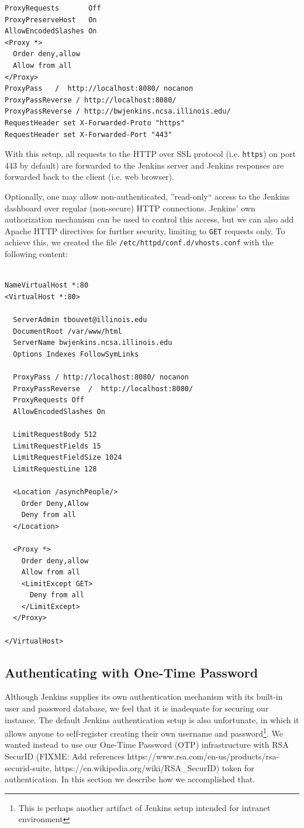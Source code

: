 \documentclass[10pt, conference, compsocconf]{IEEEtran}
\begin{document}
\begin{lstlisting}
ProxyRequests       Off
ProxyPreserveHost   On 
AllowEncodedSlashes On 
<Proxy *>
  Order deny,allow
  Allow from all  
</Proxy>
ProxyPass   /  http://localhost:8080/ nocanon
ProxyPassReverse / http://localhost:8080/
ProxyPassReverse / http://bwjenkins.ncsa.illinois.edu/
RequestHeader set X-Forwarded-Proto "https"
RequestHeader set X-Forwarded-Port "443"    
\end{lstlisting}

With this setup, all requests to the HTTP over SSL protocol (i.e. \texttt{https}) on port 443 by default) are forwarded to the Jenkins server and Jenkins responses are forwarded back to the client (i.e. web browser).

Optionally, one may allow non-authenticated, ''read-only`` access to the Jenkins dashboard over regular (non-secure) HTTP connections. 
Jenkins' own authorization mechanism can be used to control this access, but we can also add Apache HTTP directives for further security, limiting to \texttt{GET} requests only. 
To achieve this, we created the file \texttt{/etc/httpd/conf.d/vhosts.conf} with the following content:
\begin{lstlisting}
 
NameVirtualHost *:80
<VirtualHost *:80>

  ServerAdmin tbouvet@illinois.edu
  DocumentRoot /var/www/html
  ServerName bwjenkins.ncsa.illinois.edu
  Options Indexes FollowSymLinks

  ProxyPass / http://localhost:8080/ nocanon
  ProxyPassReverse  /  http://localhost:8080/
  ProxyRequests Off
  AllowEncodedSlashes On

  LimitRequestBody 512
  LimitRequestFields 15
  LimitRequestFieldSize 1024
  LimitRequestLine 128

  <Location /asynchPeople/>
    Order Deny,Allow
    Deny from all
  </Location>

  <Proxy *>
    Order deny,allow
    Allow from all
    <LimitExcept GET>
      Deny from all
    </LimitExcept>
  </Proxy>

</VirtualHost>

\end{lstlisting}

\subsection{Authenticating with One-Time Password}

Although Jenkins supplies its own authentication mechanism with its built-in user and password database, we feel that it is inadequate for securing our instance. 
The default Jenkins authentication setup is also unfortunate, in which it allows anyone to self-register creating their own username and password\footnote{This is perhaps another artifact of Jenkins setup intended for intranet environment}. 
We wanted instead to use our One-Time Password (OTP) infrastructure with RSA SecurID (FIXME: Add references https://www.rsa.com/en-us/products/rsa-securid-suite, https://en.wikipedia.org/wiki/RSA_SecurID) token for authentication. 
In this section we describe how we accomplished that.
\end{document}
